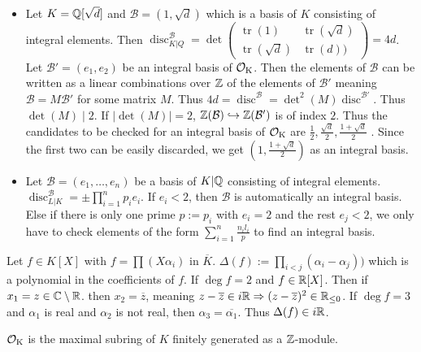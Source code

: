 \documentclass[12pt, a4paper]{article}
\DeclareMathOperator{\tr}{tr}
\DeclareMathOperator{\disc}{disc}
\begin{document}
	\begin{ex} \
		\begin{itemize}
			\item Let $K = \mathbb{Q}[\sqrt{d}]$ and $\mathcal{B} = (1, \sqrt{d})$ 
				which is a basis of $K$ consisting of integral elements.
				Then $\disc_{K\vert Q}^{\mathcal{B}} = \det \begin{pmatrix}
					\tr(1) & \tr(\sqrt{d}) \\
					\tr(\sqrt{d})& \tr(d))
				\end{pmatrix} = 4d$. Let $\mathcal{B}' = (e_1, e_2)$ be an integral 
				basis of $\operatorname{\mathcal{O}_K}$. Then the elements of $\mathcal{B}$ can be written as a 
				linear combinations over $\mathbb{Z}$ of the elements of $\mathcal{B'}$ 
				meaning $\mathcal{B} = M \mathcal{B}'$ for some matrix $M$. Thus 
				$4d = \disc^{\mathcal{B}} = \det^2(M) \disc^{\mathcal{B}'}$. 
				Thus $\det(M) \mid 2$. If $|\det(M)| = 2$, $\mathbb{Z}(\mathcal{B}) 
				\hookrightarrow \mathbb{Z}(\mathcal{B}')$ is of index $2$.  Thus 
				the candidates to be checked for an integral basis 
				of $\operatorname{\mathcal{O}_K}$ are $\frac{1}{2}, \frac{\sqrt{d}}{2}, \frac{1+\sqrt{d}{}}{2}$
				. Since the first two can be easily discarded, we get 
				$(1, \frac{1+\sqrt{d}}{2})$ as an integral basis.
			\item Let $\mathcal{B} = (e_1, \dots, e_n)$ be a 
				basis of $K\vert \mathbb{Q}$ consisting of integral elements.
				$\disc_{L \vert K}^{\mathcal{B}} = \pm \prod_{i=1}^{n} p_i{e_i}$. 
				If $e_i < 2$, then $\mathcal{B}$ is automatically 
				an integral basis. Else if there is only one 
				prime $p := p_i$ with $e_i = 2$ and the rest $e_j < 2$, 
				we only have to check elements of the form 
				$\sum_{i=1}^{n}\frac{n_il_i}{p}$ to find an integral basis.
		\end{itemize}
	\end{ex}

	Let $f \in K[X]$ with $f = \prod (X \alpha_i)$ in 
	$\overline{K}$. $\Delta(f) := \prod_{i < j} 
	(\alpha_i - \alpha_j))$ which is a polynomial 
	in the coefficients of $f$. If 
	$\deg f = 2$ and $f\in \mathbb{R}[X]$. Then if $x_1 = z
	\in \mathbb{C} \setminus \mathbb{R}$.
	then $x_2 = \overline{z}$, meaning $z -\overline{z}
	\in i\mathbb{R} \Rightarrow (z-\overline{z})^2 \in \mathbb{R}_{\leq 0
	}$.
If $\deg f = 3$ and $\alpha_1$ is real and $\alpha_2$
is not real, then $\alpha_3 = \overline{\alpha_1}$.
Thus $\Delta(f) \in i\mathbb{R}$.
\begin{prop}{}{}
	$\operatorname{\mathcal{O}_K}$ is the maximal subring of $K$ finitely 
	generated as a $\mathbb{Z}$-module.
\end{prop}
\end{document}
